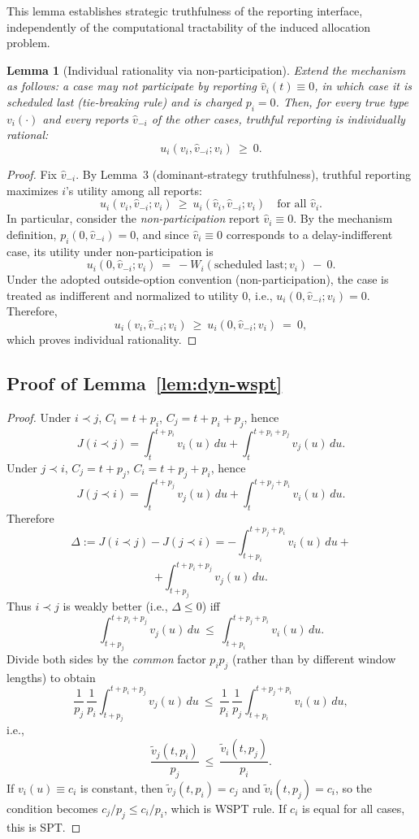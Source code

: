 \documentclass[letterpaper]{article}
\newtheorem{lemma}{Lemma}
\begin{document}
This lemma establishes strategic truthfulness of the reporting
interface, independently of the computational tractability of
the induced allocation problem.


\begin{lemma}[Individual rationality via non-participation]\label{lem:IR-optout}
Extend the mechanism as follows: a case may \emph{not participate} by reporting
$\hat v_i(t)\equiv 0$, in which case it is scheduled last (tie-breaking rule) and
is charged $p_i=0$.
Then, for every true type $v_i(\cdot)$ and every reports $\hat v_{-i}$ of the other
cases, truthful reporting is individually rational:
\[
u_i(v_i,\hat v_{-i};v_i)\ \ge\ 0.
\]
\end{lemma}

\begin{proof}
Fix $\hat v_{-i}$. By Lemma~3 (dominant-strategy truthfulness),
truthful reporting maximizes $i$'s utility among all reports:
\[
u_i(v_i,\hat v_{-i};v_i)\ \ge\ u_i(\hat v_i,\hat v_{-i};v_i)
\quad \text{for all } \hat v_i.
\]
In particular, consider the \emph{non-participation} report $\hat v_i\equiv 0$.
By the mechanism definition, $p_i(0,\hat v_{-i})=0$, and since $\hat v_i\equiv 0$
corresponds to a delay-indifferent case, its utility under non-participation is
\[
u_i(0,\hat v_{-i};v_i)\ =\ -W_i(\text{scheduled last};v_i)\ -\ 0.
\]
Under the adopted outside-option convention (non-participation), the case is
treated as indifferent and normalized to utility $0$, i.e.,
$u_i(0,\hat v_{-i};v_i)=0$.
Therefore,
\[
u_i(v_i,\hat v_{-i};v_i)\ \ge\ u_i(0,\hat v_{-i};v_i)\ =\ 0,
\]
which proves individual rationality.
\end{proof}



\subsection{Proof of Lemma~\ref{lem:dyn-wspt}}
   \begin{proof}
Under $i\prec j$, $C_i=t+p_i$, $C_j=t+p_i+p_j$, hence
\[
J(i\prec j)=\int_{t}^{t+p_i} v_i(u)\,du+\int_{t}^{t+p_i+p_j} v_j(u)\,du.
\]
Under $j\prec i$, $C_j=t+p_j$, $C_i=t+p_j+p_i$, hence
\[
J(j\prec i)=\int_{t}^{t+p_j} v_j(u)\,du+\int_{t}^{t+p_j+p_i} v_i(u)\,du.
\]
Therefore
\[
\Delta:=J(i\prec j)-J(j\prec i)
=-\!\int_{t+p_i}^{t+p_j+p_i}\! v_i(u)\,du +
\]
\[
+\!\int_{t+p_j}^{t+p_i+p_j}\! v_j(u)\,du .
\]
Thus $i\prec j$ is weakly better (i.e., $\Delta\le0$) iff
\[
\int_{t+p_j}^{t+p_i+p_j}\! v_j(u)\,du
\ \le\
\int_{t+p_i}^{t+p_j+p_i}\! v_i(u)\,du .
\]
Divide both sides by the \emph{common} factor $p_ip_j$ (rather than by different window lengths) to obtain
\[
\frac{1}{p_j}\,\frac{1}{p_i}\!\int_{t+p_j}^{t+p_i+p_j}\! v_j(u)\,du
\ \le\
\frac{1}{p_i}\,\frac{1}{p_j}\!\int_{t+p_i}^{t+p_j+p_i}\! v_i(u)\,du,
\]
i.e.,
\[
\frac{\tilde v_j(t, p_i)}{p_j}\ \le\ \frac{\tilde v_i(t, p_j)}{p_i}.
\]
If $v_i(u)\equiv c_i$ is constant, then $\tilde v_j(t,p_i)=c_j$ and $\tilde v_i(t,p_j)=c_i$, so the condition becomes
$c_j/p_j \le c_i/p_i$, which is WSPT rule. 
If $c_i$ is equal for all cases, this is SPT. 
\end{proof}
\end{document}
